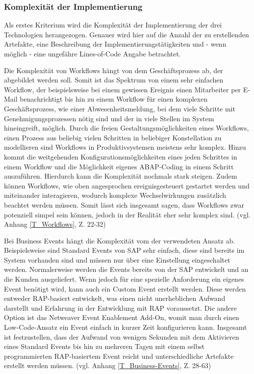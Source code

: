 \subsubsection{Komplexität der Implementierung}

Als erstes Kriterium wird die Komplexität der Implementierung der drei Technologien herangezogen. Genauer wird hier auf die Anzahl der zu erstellenden Artefakte, eine Beschreibung der Implementierungstätigkeiten und - wenn möglich - eine ungefähre Lines-of-Code Angabe betrachtet.

Die Komplexität von Workflows hängt von dem Geschäftsprozess ab, der abgebildet werden soll. Somit ist das Spektrum von einem sehr einfachen Workflow, der beispielsweise bei einem gewissen Ereignis einen Mitarbeiter per E-Mail benachrichtigt bis hin zu einem Workflow für einen komplexen Geschäftsprozess, wie einer Abwesenheitsmeldung, bei dem viele Schritte mit Genehmigungsprozessen nötig sind und der in viele Stellen im System hineingreift, möglich. Durch die freien Gestaltungsmöglichkeiten eines Workflows, einen Prozess aus beliebig vielen Schritten in beliebiger Konstellation zu modellieren sind Workflows in Produktivsystemen meistens sehr komplex. Hinzu kommt die weitgehenden Konfigurationsmöglichkeiten eines jeden Schrittes in einem Workflow und die Möglichkeit eigenes ABAP-Coding in einem Schritt auszuführen. Hierdurch kann die Komplexität nochmals stark steigen. Zudem können Workflows, wie oben angesprochen ereignisgesteuert gestartet werden und miteinander interagieren, wodurch komplexe Wechselwirkungen zusätzlich beachtet werden müssen. Somit lässt sich insgesamt sagen, dass Workflows zwar potenziell simpel sein können, jedoch in der Realität eher sehr komplex sind. (vgl. Anhang \ref{T_Workflows}, Z. 22-32)

Bei Business Events hängt die Komplexität vom der verwendeten Ansatz ab. Beispielsweise sind Standard Events von SAP sehr einfach, diese sind bereits im System vorhanden sind und müssen nur über eine Einstellung eingeschaltet werden. Normalerweise werden die Events bereits von der SAP entwickelt und an die Kunden ausgeliefert. Wenn jedoch für eine spezielle Anforderung ein eigenes Event benötigt wird, kann auch ein Custom Event erstellt werden. Diese werden entweder RAP-basiert entwickelt, was einen nicht unerheblichen Aufwand darstellt und Erfahrung in der Entwicklung mit RAP voraussetzt. Die andere Option ist das Netweaver Event Enablement Add-On, womit man durch einen Low-Code-Ansatz ein Event einfach in kurzer Zeit konfigurieren kann. Insgesamt ist festzustellen, dass der Aufwand von wenigen Sekunden mit dem Aktivieren eines Standard Events bis hin zu mehreren Tagen mit einem selbst programmierten RAP-basiertem Event reicht und unterschiedliche Artefakte erstellt werden müssen. (vgl. Anhang \ref{T_Business-Events}, Z. 28-63)


